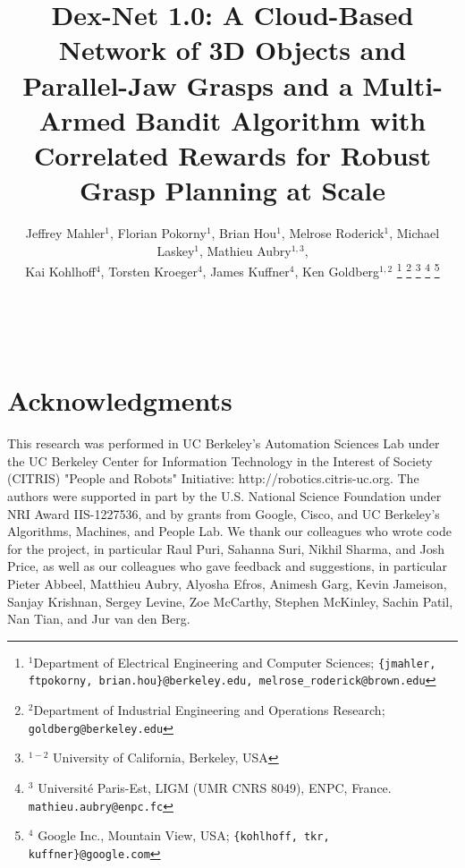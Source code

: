 \documentclass[letterpaper, 10 pt, conference]{ieeeconf}  %
\begin{document}
\title{\LARGE \bf Dex-Net 1.0: A Cloud-Based Network of 3D Objects and Parallel-Jaw Grasps and a Multi-Armed Bandit Algorithm with Correlated Rewards for Robust Grasp Planning at Scale
		}
\author{Jeffrey Mahler$^1$, Florian Pokorny$^1$, Brian Hou$^1$, Melrose Roderick$^1$, Michael Laskey$^1$, Mathieu Aubry$^{1,3}$, \\
Kai Kohlhoff$^4$, Torsten Kroeger$^4$, James Kuffner$^4$, Ken Goldberg$^{1,2}$
\thanks{$^1$Department of Electrical Engineering and Computer Sciences; {\tt\small \{jmahler, ftpokorny, brian.hou\}@berkeley.edu, melrose\_roderick@brown.edu}}%
\thanks{$^2$Department of Industrial Engineering and Operations Research; {\tt\small goldberg@berkeley.edu}}%
\thanks{$^{1-2}$ University of California, Berkeley, USA}%
\thanks{$^3$ Universit\'e Paris-Est, LIGM (UMR CNRS 8049), ENPC, France. {\tt\small mathieu.aubry@enpc.fc}}%
\thanks{$^4$ Google Inc., Mountain View, USA; {\tt\small \{kohlhoff, tkr, kuffner\}@google.com}}
}
\maketitle

 \\

%


%


%




%

\section{Acknowledgments}
This research was performed in UC Berkeley's Automation Sciences Lab under the UC Berkeley Center for Information Technology in the Interest of Society (CITRIS) "People and Robots" Initiative: http://robotics.citris-uc.org.
The authors were supported in part by the U.S. National Science Foundation under NRI Award IIS-1227536, and by grants from Google, Cisco, and UC Berkeley's Algorithms, Machines, and People Lab.
We thank our colleagues who wrote code for the project, in particular Raul Puri, Sahanna Suri, Nikhil Sharma, and Josh Price, as well as our colleagues who gave feedback and suggestions, in particular Pieter Abbeel, Matthieu Aubry, Alyosha Efros, Animesh Garg, Kevin Jameison, Sanjay Krishnan, Sergey Levine, Zoe McCarthy, Stephen McKinley, Sachin Patil, Nan Tian, and Jur van den Berg.



\end{document}

